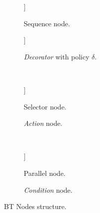 \documentclass[a4paper,UKenglish,cleveref, autoref, thm-restate]{oasics-v2019}
\begin{document}
\begin{figure}[h]
    \begin{subfigure}{.5\textwidth}
        \centering
        \captionsetup{justification=centering}
        \begin{behavior}
            [\sequence
                [\action{Child 1}]
                [{\textbf{. . .}}, inner sep=10pt]
                [\action{Child N}]
            ]
        \end{behavior}
        \caption{Sequence node.}
        \label{fig:sequence}
    \end{subfigure}%
    \begin{subfigure}{.5\textwidth}
        \centering
        \captionsetup{justification=centering}
        \begin{behavior}
            [\decorator{$\delta$},
                [\action{Child}]
            ]
        \end{behavior}
        \caption{\textit{Decorator} with policy $\delta$.}
        \label{fig:decorator}
    \end{subfigure}\\
    \begin{subfigure}{.5\textwidth}
        \centering
        \captionsetup{justification=centering}
        \begin{behavior}
            [\selector
                [\action{Child 1}]
                [{\textbf{. . .}}, inner sep=10pt]
                [\action{Child N}]
            ]
        \end{behavior}
        \caption{Selector node.}
        \label{fig:selector}
    \end{subfigure}%
    \begin{subfigure}{.5\textwidth}
        \centering
        \captionsetup{justification=centering}
        \begin{behavior}
        \end{behavior}
        \caption{\textit{Action} node.}
        \label{fig:action}
    \end{subfigure}\\
    \begin{subfigure}{.5\textwidth}
        \centering
        \captionsetup{justification=centering}
        \begin{behavior}
            [\parallel{M}
                [\action{Child 1}]
                [{\textbf{. . .}}, inner sep=10pt]
                [\action{Child N}]
            ]
        \end{behavior}
        \caption{Parallel node.}
        \label{fig:parallel}
    \end{subfigure}%
    \begin{subfigure}{.5\textwidth}
        \centering
        \captionsetup{justification=centering}
        \begin{behavior}
        \end{behavior}
        \caption{\textit{Condition} node.}
        \label{fig:condition}
    \end{subfigure}

    \caption{BT Nodes structure.}
\end{figure}
\end{document}
